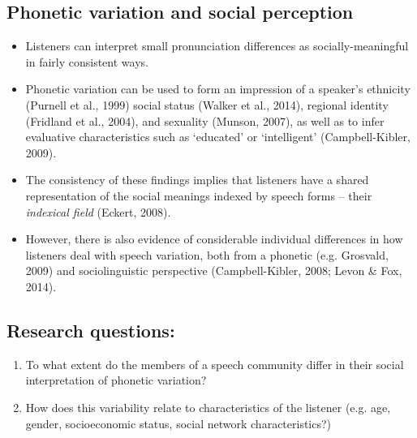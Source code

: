 \documentclass[a0,portrait]{a0poster}
\begin{document}
\begin{multicols}{3}							%
\raggedcolumns							%

\section*{Phonetic variation and social perception}
\begin{itemize}

\item{Listeners can interpret small pronunciation differences as socially-meaningful in fairly consistent ways.} 

\item{Phonetic variation can be used to form an impression of a speaker's ethnicity (Purnell et al., 1999) social status (Walker et al., 2014), regional identity (Fridland et al., 2004), and sexuality (Munson, 2007), as well as to infer evaluative characteristics such as `educated' or `intelligent' (Campbell-Kibler, 2009).}

\item{The consistency of these findings implies that listeners have a shared
representation of the social meanings indexed by speech forms -- their
\textit{indexical field} (Eckert, 2008).}

\item{However, there is also evidence of considerable individual differences in how listeners deal with speech variation, both from a phonetic (e.g. Grosvald, 2009) and sociolinguistic perspective (Campbell-Kibler, 2008; Levon \& Fox, 2014).}


\end{itemize}
\vspace*{-1cm}
\subsection*{Research questions:}
\begin{enumerate}
\item{To what extent do the members of a speech community differ in their social interpretation of phonetic variation?}

\item{How does this variability relate to characteristics of the listener (e.g. age, gender, socioeconomic status, social network characteristics?)}
\end{enumerate}
\vspace*{-1cm}



\end{multicols}
\end{document}
